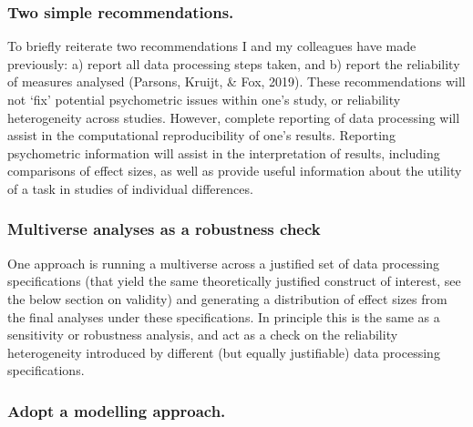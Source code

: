 \documentclass[
  english,
  man,floatsintext]{apa6}
\begin{document}
\hypertarget{two-simple-recommendations.}{%
\subsubsection{Two simple recommendations.}\label{two-simple-recommendations.}}

To briefly reiterate two recommendations I and my colleagues have made previously: a) report all data processing steps taken, and b) report the reliability of measures analysed (Parsons, Kruijt, \& Fox, 2019). These recommendations will not `fix' potential psychometric issues within one's study, or reliability heterogeneity across studies. However, complete reporting of data processing will assist in the computational reproducibility of one's results. Reporting psychometric information will assist in the interpretation of results, including comparisons of effect sizes, as well as provide useful information about the utility of a task in studies of individual differences.

\hypertarget{multiverse-analyses-as-a-robustness-check}{%
\subsubsection{Multiverse analyses as a robustness check}\label{multiverse-analyses-as-a-robustness-check}}

One approach is running a multiverse across a justified set of data processing specifications (that yield the same theoretically justified construct of interest, see the below section on validity) and generating a distribution of effect sizes from the final analyses under these specifications. In principle this is the same as a sensitivity or robustness analysis, and act as a check on the reliability heterogeneity introduced by different (but equally justifiable) data processing specifications.

\hypertarget{adopt-a-modelling-approach.}{%
\subsubsection{Adopt a modelling approach.}\label{adopt-a-modelling-approach.}}
\end{document}

